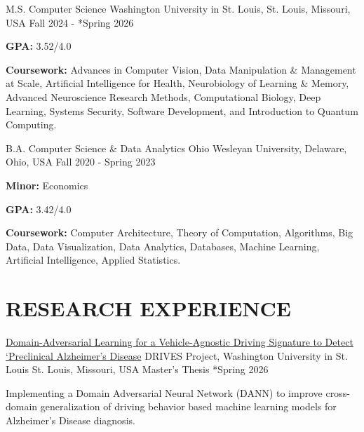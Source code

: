 \documentclass[10pt, letterpaper]{article}
\begin{document}
\begin{educationentry}
  {M.S. Computer Science} %
  {Washington University in St. Louis, St. Louis, Missouri, USA} %
  {Fall 2024 - *Spring 2026} %
  \item \textbf{GPA:} 3.52/4.0
  \item \textbf{Coursework:}  Advances in Computer Vision, Data Manipulation \& Management at Scale, Artificial Intelligence for Health, Neurobiology of Learning \& Memory, Advanced Neuroscience Research Methods, Computational Biology, Deep Learning, Systems Security, Software Development, and Introduction to Quantum Computing.
\end{educationentry}

\begin{educationentry}
  {B.A. Computer Science \& Data Analytics} %
  {Ohio Wesleyan University, Delaware, Ohio, USA} %
  {Fall 2020 - Spring 2023} %
  \item \textbf{Minor:} Economics
  \item \textbf{GPA:} 3.42/4.0
  \item \textbf{Coursework:} Computer Architecture, Theory of Computation, Algorithms, Big Data, Data Visualization, Data Analytics, Databases, Machine Learning, Artificial Intelligence, Applied Statistics.
\end{educationentry}

\vspace{\headerSpacing}

\section{RESEARCH EXPERIENCE}

\begin{researchentry}
  {\href{}{Domain-Adversarial Learning for a Vehicle-Agnostic Driving Signature to Detect `Preclinical Alzheimer's Disease}} %
  {DRIVES Project, Washington University in St. Louis} %
  {St. Louis, Missouri, USA} %
  {Master's Thesis} %
  {*Spring 2026} %
  \item Implementing a Domain Adversarial Neural Network (DANN) to improve cross-domain generalization of driving behavior based machine learning models for Alzheimer's Disease diagnosis.
\end{researchentry}
\end{document}
